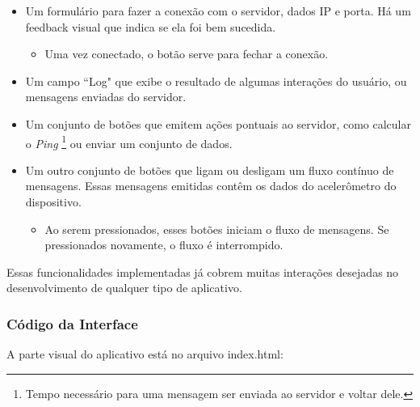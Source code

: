 \documentclass[a4paper,12pt]{article}
\begin{document}
\begin{itemize}
\item Um formulário para fazer a conexão com o servidor, dados IP e porta. Há um feedback visual que indica se ela foi bem sucedida.

\begin{itemize}
\item Uma vez conectado, o botão serve para fechar a conexão.
\end{itemize}

\item Um campo “Log" que exibe o resultado de algumas interações do usuário, ou mensagens enviadas do servidor.

\item Um conjunto de botões que emitem ações pontuais ao servidor, como calcular o \emph{Ping} \footnote{Tempo necessário para uma mensagem ser enviada ao servidor e voltar dele.} ou enviar um conjunto de dados.

\item Um outro conjunto de botões que ligam ou desligam um fluxo contínuo de mensagens. Essas mensagens emitidas contêm os dados do acelerômetro do dispositivo.

\begin{itemize}
\item Ao serem pressionados, esses botões iniciam o fluxo de mensagens. Se pressionados novamente, o fluxo é interrompido.
\end{itemize}

\end{itemize}

Essas funcionalidades implementadas já cobrem muitas interações desejadas no desenvolvimento de qualquer tipo de aplicativo.


\subsubsection{Código da Interface}
A parte visual do aplicativo está no arquivo index.html:
\end{document}
